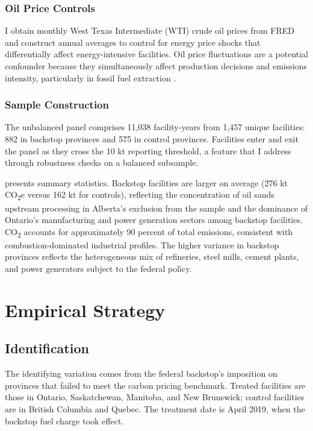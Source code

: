 \documentclass[12pt]{article}
\begin{document}
\subsubsection*{Oil Price Controls} I obtain monthly West Texas Intermediate (WTI) crude oil prices from FRED and construct annual averages to control for energy price shocks that differentially affect energy-intensive facilities. Oil price fluctuations are a potential confounder because they simultaneously affect production decisions and emissions intensity, particularly in fossil fuel extraction \citep{Kilian2009}.

\subsubsection*{Sample Construction} The unbalanced panel comprises 11,038 facility-years from 1,457 unique facilities: 882 in backstop provinces and 575 in control provinces. Facilities enter and exit the panel as they cross the 10 kt reporting threshold, a feature that I address through robustness checks on a balanced subsample.



 presents summary statistics. Backstop facilities are larger on average (276 kt CO\textsubscript{2}e versus 162 kt for controls), reflecting the concentration of oil sands upstream processing in Alberta's exclusion from the sample and the dominance of Ontario's manufacturing and power generation sectors among backstop facilities. CO\textsubscript{2} accounts for approximately 90 percent of total emissions, consistent with combustion-dominated industrial profiles. The higher variance in backstop provinces reflects the heterogeneous mix of refineries, steel mills, cement plants, and power generators subject to the federal policy.


\section{Empirical Strategy}
\label{sec:strategy}

\subsection{Identification}

The identifying variation comes from the federal backstop's imposition on provinces that failed to meet the carbon pricing benchmark. Treated facilities are those in Ontario, Saskatchewan, Manitoba, and New Brunswick; control facilities are in British Columbia and Quebec. The treatment date is April 2019, when the backstop fuel charge took effect.
\end{document}
